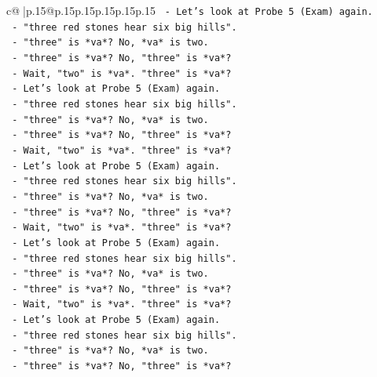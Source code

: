 \documentclass{article}
\begin{document}
{\begin{supertabular}{c@{$\;$}|p{.15\linewidth}@{}p{.15\linewidth}p{.15\linewidth}p{.15\linewidth}p{.15\linewidth}p{.15\linewidth}}
{{{\texttt{                {-} Let's look at Probe 5 (Exam) again.} \\
\texttt{                {-} "three red stones hear six big hills".} \\
\texttt{                {-} "three" is *va*? No, *va* is two.} \\
\texttt{                {-} "three" is *va*? No, "three" is *va*?} \\
\texttt{                {-} Wait, "two" is *va*. "three" is *va*?} \\
\texttt{                {-} Let's look at Probe 5 (Exam) again.} \\
\texttt{                {-} "three red stones hear six big hills".} \\
\texttt{                {-} "three" is *va*? No, *va* is two.} \\
\texttt{                {-} "three" is *va*? No, "three" is *va*?} \\
\texttt{                {-} Wait, "two" is *va*. "three" is *va*?} \\
\texttt{                {-} Let's look at Probe 5 (Exam) again.} \\
\texttt{                {-} "three red stones hear six big hills".} \\
\texttt{                {-} "three" is *va*? No, *va* is two.} \\
\texttt{                {-} "three" is *va*? No, "three" is *va*?} \\
\texttt{                {-} Wait, "two" is *va*. "three" is *va*?} \\
\texttt{                {-} Let's look at Probe 5 (Exam) again.} \\
\texttt{                {-} "three red stones hear six big hills".} \\
\texttt{                {-} "three" is *va*? No, *va* is two.} \\
\texttt{                {-} "three" is *va*? No, "three" is *va*?} \\
\texttt{                {-} Wait, "two" is *va*. "three" is *va*?} \\
\texttt{                {-} Let's look at Probe 5 (Exam) again.} \\
\texttt{                {-} "three red stones hear six big hills".} \\
\texttt{                {-} "three" is *va*? No, *va* is two.} \\
\texttt{                {-} "three" is *va*? No, "three" is *va*?} \\
}}}
\end{supertabular}}
\end{document}
